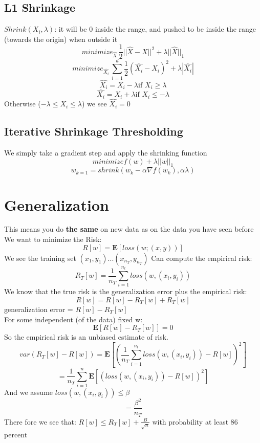 \documentclass{article}
\begin{document}
\subsection{L1 Shrinkage}
$Shrink(X_i, \lambda)$: it will be 0 inside the range, and pushed to be inside the range (towards the origin) when outside it
$$minimize_{\hat{X}} \, \frac{1}{2}||\hat{X}-X||^2 + \lambda||\hat{X}||_1$$
$$minimize_{\hat{X_i}} \,\sum_{i=1}^d \frac{1}{2}(\hat{X_i}-X_i)^2 + \lambda|\hat{X_i}|$$
$$\hat{X_i} = X_i - \lambda \textrm{if } X_i \geq \lambda$$
$$\hat{X_i} = X_i + \lambda \textrm{if } X_i \leq -\lambda$$
Otherwise ($-\lambda \leq X_i \leq \lambda$) we see $\hat{X_i}=0$

\subsection{Iterative Shrinkage Thresholding}
We simply take a gradient step and apply the shrinking function
$$minimize f(w) + \lambda ||w||_1$$
$$w_{k=1} = shrink(w_k - \alpha \nabla f(w_k),\alpha \lambda)$$

\section{Generalization}
This means you do \textbf{the same} on new data as on the data you have seen before
We want to minimize the Risk:
$$R[w] = \mathbf{E}[loss(w;(x,y))]$$
We see the training set $(x_1, y_1)...(x_{n_T},y_{n_T})$
Can compute the empirical risk:
$$R_T[w] = \frac{1}{n_T} \sum_{i=1}^{n_t} loss(w,(x_i,y_i))$$
We know that the true risk is the generalization error plus the empirical risk:
$$R[w] = R[w] - R_T[w] + R_T[w]$$
generalization error = $R[w] - R_T[w]$\\
For some independent (of the data) fixed w:
$$\mathbf{E}[R[w] - R_T[w]] = 0$$
So the empirical risk is an unbiased estimate of risk.
$$var(R_T[w] - R[w]) = \mathbf{E}[(\frac{1}{n_T} \sum_{i=1}^{n_t} loss(w,(x_i,y_i)) - R[w])^2]$$
$$= \frac{1}{n_T} \sum_{i=1}^n \mathbf{E}[(loss(w,(x_i,y_i)) - R[w])^2]$$
And we assume $loss(w,(x_i,y_i)) \leq \beta$
$$= \frac{\beta^2}{n_T}$$
There fore we see that: $R[w] \leq R_T[w] + \frac{B}{\sqrt{n}}$ with probability at least 86 percent
\end{document}
